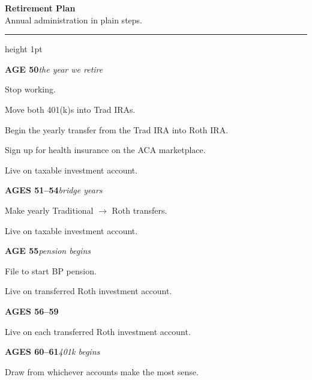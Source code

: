 \documentclass[10pt]{article}
\newcommand{\stagebar}[2]{%
  \vspace{2pt}%
  \noindent\colorbox{sage}{%
    \parbox{\dimexpr\linewidth-2\fboxsep\relax}{%
      \color{white}\textbf{#1}\hfill\textit{\small #2}}}%
  \par\vspace{3pt}}
\begin{document}
{\color{ink}\fontsize{17}{20}\selectfont\bfseries Retirement Plan}\\[2pt]
{\color{graytext}\small Annual administration in plain steps.}\\[5pt]
{\color{sage}\hrule height 1pt}
\vspace{10pt}

\begin{minipage}[t]{0.485\textwidth}

\stagebar{AGE 50}{the year we retire}
\begin{steps}
  \item Stop working.
  \item Move both 401(k)s into Trad IRAs.
  \item Begin the yearly transfer from the Trad IRA into Roth IRA.
  \item Sign up for health insurance on the ACA marketplace.
  \item Live on taxable investment account.
\end{steps}

\stagebar{AGES 51--54}{bridge years}
\begin{steps}
  \item Make yearly Traditional \(\rightarrow\) Roth transfers.
  \item Live on taxable investment account.
\end{steps}

\stagebar{AGE 55}{pension begins}
\begin{steps}
  \item File to start BP pension.
  \item Live on transferred Roth investment account.
\end{steps}

\stagebar{AGES 56--59}{}
\begin{steps}
  \item Live on each transferred Roth investment account.
\end{steps}

\stagebar{AGES 60--61}{401k begins}
\begin{steps}
  \item Draw from whichever accounts make the most sense.
\end{steps}

\end{minipage}\hfill
\end{document}
